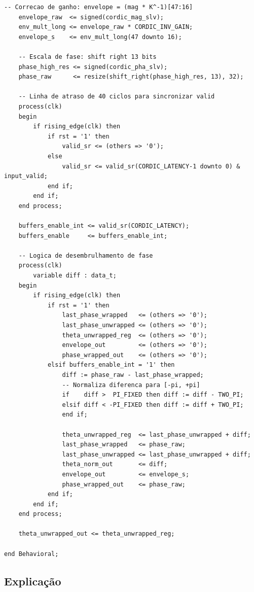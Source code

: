 \documentclass[a4paper,12pt]{article}
\begin{document}
\begin{lstlisting}[style=vhdlstyle,
    caption={C\'odigo VHDL do \texttt{Input\_Processing\_Block}.},
    label={lst:ipb}]
    -- Correcao de ganho: envelope = (mag * K^-1)[47:16]
    envelope_raw  <= signed(cordic_mag_slv);
    env_mult_long <= envelope_raw * CORDIC_INV_GAIN;
    envelope_s    <= env_mult_long(47 downto 16);

    -- Escala de fase: shift right 13 bits
    phase_high_res <= signed(cordic_pha_slv);
    phase_raw      <= resize(shift_right(phase_high_res, 13), 32);

    -- Linha de atraso de 40 ciclos para sincronizar valid
    process(clk)
    begin
        if rising_edge(clk) then
            if rst = '1' then
                valid_sr <= (others => '0');
            else
                valid_sr <= valid_sr(CORDIC_LATENCY-1 downto 0) & input_valid;
            end if;
        end if;
    end process;

    buffers_enable_int <= valid_sr(CORDIC_LATENCY);
    buffers_enable     <= buffers_enable_int;

    -- Logica de desembrulhamento de fase
    process(clk)
        variable diff : data_t;
    begin
        if rising_edge(clk) then
            if rst = '1' then
                last_phase_wrapped   <= (others => '0');
                last_phase_unwrapped <= (others => '0');
                theta_unwrapped_reg  <= (others => '0');
                envelope_out         <= (others => '0');
                phase_wrapped_out    <= (others => '0');
            elsif buffers_enable_int = '1' then
                diff := phase_raw - last_phase_wrapped;
                -- Normaliza diferenca para [-pi, +pi]
                if    diff >  PI_FIXED then diff := diff - TWO_PI;
                elsif diff < -PI_FIXED then diff := diff + TWO_PI;
                end if;

                theta_unwrapped_reg  <= last_phase_unwrapped + diff;
                last_phase_wrapped   <= phase_raw;
                last_phase_unwrapped <= last_phase_unwrapped + diff;
                theta_norm_out       <= diff;
                envelope_out         <= envelope_s;
                phase_wrapped_out    <= phase_raw;
            end if;
        end if;
    end process;

    theta_unwrapped_out <= theta_unwrapped_reg;

end Behavioral;
\end{lstlisting}

\subsection{Explica\c{c}\~ao}
\end{document}
